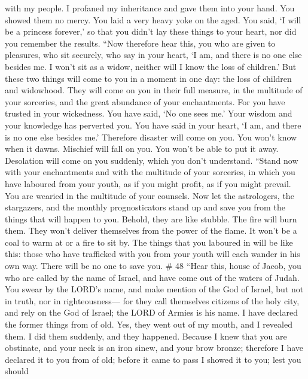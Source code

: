 with my people. I profaned my inheritance and gave them into your hand.
You showed them no mercy. You laid a very heavy yoke on the aged.
 You said, `I will be a princess forever,' so that you
didn't lay these things to your heart, nor did you remember the results.
 ``Now therefore hear this, you who are given to pleasures,
who sit securely, who say in your heart, `I am, and there is no one else
besides me. I won't sit as a widow, neither will I know the loss of
children.'  But these two things will come to you in a
moment in one day: the loss of children and widowhood. They will come on
you in their full measure, in the multitude of your sorceries, and the
great abundance of your enchantments.  For you have trusted
in your wickedness. You have said, `No one sees me.' Your wisdom and
your knowledge has perverted you. You have said in your heart, `I am,
and there is no one else besides me.'  Therefore disaster
will come on you. You won't know when it dawns. Mischief will fall on
you. You won't be able to put it away. Desolation will come on you
suddenly, which you don't understand.  ``Stand now with
your enchantments and with the multitude of your sorceries, in which you
have laboured from your youth, as if you might profit, as if you might
prevail.  You are wearied in the multitude of your
counsels. Now let the astrologers, the stargazers, and the monthly
prognosticators stand up and save you from the things that will happen
to you.  Behold, they are like stubble. The fire will burn
them. They won't deliver themselves from the power of the flame. It
won't be a coal to warm at or a fire to sit by.  The things
that you laboured in will be like this: those who have trafficked with
you from your youth will each wander in his own way. There will be no
one to save you. \# 48  ``Hear this, house of Jacob, you who
are called by the name of Israel, and have come out of the waters of
Judah. You swear by the LORD's name, and make mention of the God of
Israel, but not in truth, nor in righteousness---  for they
call themselves citizens of the holy city, and rely on the God of
Israel; the LORD of Armies is his name.  I have declared the
former things from of old. Yes, they went out of my mouth, and I
revealed them. I did them suddenly, and they happened. 
Because I knew that you are obstinate, and your neck is an iron sinew,
and your brow bronze;  therefore I have declared it to you
from of old; before it came to pass I showed it to you; lest you should
